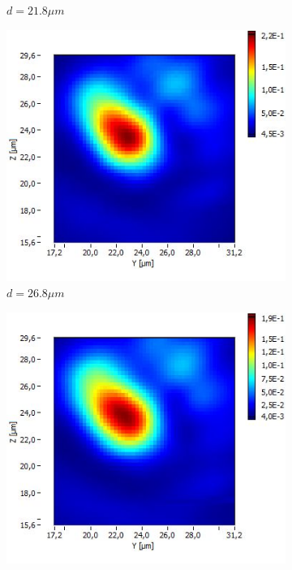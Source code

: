 \documentclass[a4paper,11pt]{article}
\begin{document}
\begin{figure}[htb]
\begin{subfigure}[b]{.20\linewidth}
    \caption{$d=21.8\mu m$}
  \end{subfigure}
  \begin{subfigure}[b]{.20\linewidth}
    \centering
    \includegraphics[width=\textwidth]{Fibre5/scan_029_g1.jpg}
    \caption{$d=26.8\mu m$}
  \end{subfigure}
  \begin{subfigure}[b]{.20\linewidth}
    \centering
    \includegraphics[width=\textwidth]{Fibre5/scan_030_g1.jpg}

\end{subfigure}
\end{figure}
\end{document}
